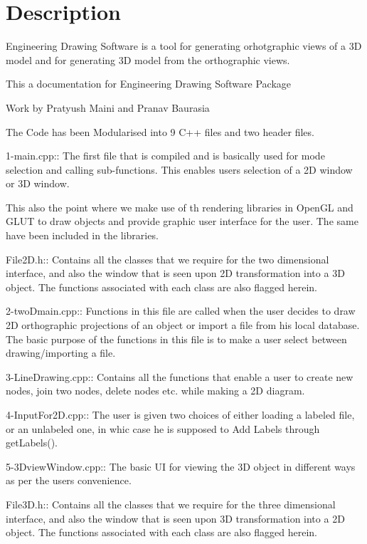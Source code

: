 \hypertarget{index_intro_sec}{}\section{Description}\label{index_intro_sec}
Engineering Drawing Software is a tool for generating orhotgraphic views of a 3D model and for generating 3D model from the orthographic views.

This a documentation for Engineering Drawing Software Package

Work by Pratyush Maini and Pranav Baurasia

The Code has been Modularised into 9 C++ files and two header files.

1-\/main.\+cpp\+:\+: The first file that is compiled and is basically used for mode selection and calling sub-\/functions. This enables users selection of a 2D window or 3D window.

This also the point where we make use of th rendering libraries in Open\+GL and G\+L\+UT to draw objects and provide graphic user interface for the user. The same have been included in the libraries.

File2\+D.\+h\+:\+: Contains all the classes that we require for the two dimensional interface, and also the window that is seen upon 2D transformation into a 3D object. The functions associated with each class are also flagged herein.

2-\/two\+Dmain.\+cpp\+:\+: Functions in this file are called when the user decides to draw 2D orthographic projections of an object or import a file from his local database. The basic purpose of the functions in this file is to make a user select between drawing/importing a file.

3-\/\+Line\+Drawing.\+cpp\+:\+: Contains all the functions that enable a user to create new nodes, join two nodes, delete nodes etc. while making a 2D diagram.

4-\/\+Input\+For2\+D.\+cpp\+:\+: The user is given two choices of either loading a labeled file, or an unlabeled one, in whic case he is supposed to Add Labels through get\+Labels().

5-\/3\+Dview\+Window.\+cpp\+:\+: The basic UI for viewing the 3D object in different ways as per the user\textquotesingle{}s convenience.

File3\+D.\+h\+:\+: Contains all the classes that we require for the three dimensional interface, and also the window that is seen upon 3D transformation into a 2D object. The functions associated with each class are also flagged herein.

